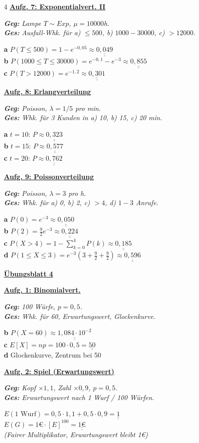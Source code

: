 \documentclass[landscape,a4paper,8pt]{article}
\newcommand{\aufgabe}[1]{\vspace{1pt}\textbf{\underline{#1}}\par}
\newcommand{\blatt}[1]{\smallskip\begin{center}\textbf{\normalsize\underline{#1}}\end{center}\par}
\newcommand{\teil}[1]{\textbf{#1}\;}
\newcommand{\erkl}[1]{{\small\textit{#1}}\par}
\newcommand{\erg}[1]{\underline{\underline{#1}}}
\begin{document}
\begin{multicols*}{4}
\aufgabe{Aufg. 7: Exponentialvert. II}
\erkl{\textbf{Geg:} Lampe $T \sim Exp$, $\mu=10000$h.\\\textbf{Ges:} Ausfall-Whk. für a) $\leq 500$, b) $1000 - 30000$, c) $>12000$.}
\teil{a} $P(T\leq500)=1-e^{-0{,}05}\approx\erg{0{,}049}$\\
\teil{b} $P(1000\leq T\leq30000)=e^{-0{,}1}-e^{-3}\approx\erg{0{,}855}$\\
\teil{c} $P(T>12000)=e^{-1{,}2}\approx\erg{0{,}301}$

\aufgabe{Aufg. 8: Erlangverteilung}
\erkl{\textbf{Geg:} Poisson, $\lambda=1/5$ pro min.\\\textbf{Ges:} Whk. für 3 Kunden in a) 10, b) 15, c) 20 min.}
\teil{a} $t=10$: $P\approx\erg{0{,}323}$\\
\teil{b} $t=15$: $P\approx\erg{0{,}577}$\\
\teil{c} $t=20$: $P\approx\erg{0{,}762}$

\aufgabe{Aufg. 9: Poissonverteilung}
\erkl{\textbf{Geg:} Poisson, $\lambda=3$ pro h.\\\textbf{Ges:} Whk. für a) 0, b) 2, c) $>4$, d) $1 - 3$ Anrufe.}
\teil{a} $P(0)=e^{-3}\approx\erg{0{,}050}$\\
\teil{b} $P(2)=\frac{9}{2}e^{-3}\approx\erg{0{,}224}$\\
\teil{c} $P(X>4)=1-\sum_{k=0}^{4}P(k)\approx\erg{0{,}185}$\\
\teil{d} $P(1\leq X\leq3)=e^{-3}(3+\frac{9}{2}+\frac{9}{2})\approx\erg{0{,}596}$


\blatt{Übungsblatt 4}

\aufgabe{Aufg. 1: Binomialvert.}
\erkl{\textbf{Geg:} 100 Würfe, $p=0{,}5$.\\\textbf{Ges:} Whk. für 60, Erwartungswert, Glockenkurve.}
\teil{b} $P(X{=}60)\approx\erg{1{,}084\cdot10^{-2}}$\\
\teil{c} $E[X]=np=100\cdot0{,}5=\erg{50}$\\
\teil{d} Glockenkurve, Zentrum bei 50

\aufgabe{Aufg. 2: Spiel (Erwartungswert)}
\erkl{\textbf{Geg:} Kopf $\times 1{,}1$, Zahl $\times 0{,}9$, $p=0{,}5$.\\\textbf{Ges:} Erwartungswert nach 1 Wurf / 100 Würfen.}
$E(\text{1 Wurf})=0{,}5\cdot1{,}1+0{,}5\cdot0{,}9=\erg{1}$\\
$E(G)=1\text{€}\cdot[E]^{100}=\erg{1\text{€}}$\\
\erkl{(Fairer Multiplikator, Erwartungswert bleibt 1€)}


\end{multicols*}
\end{document}
